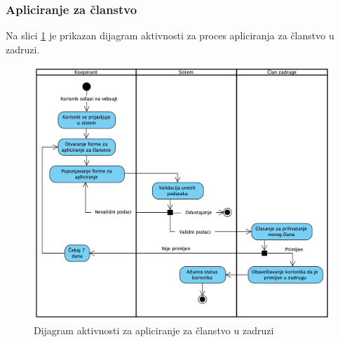 \documentclass[a4paper]{article}
\begin{document}
\subsubsection{Apliciranje za članstvo}
Na slici \ref{dakt_apliciranje_clanstvo} je prikazan dijagram aktivnosti za proces apliciranja za članstvo u zadruzi.
\begin{figure}[h!]
    \centering
    \includegraphics[scale=0.55]{images/dakt_apliciranje_clanstvo.png}
    \caption{Dijagram aktivnosti za apliciranje za članstvo u zadruzi}
    \label{dakt_apliciranje_clanstvo}
\end{figure}
\clearpage
\end{document}
